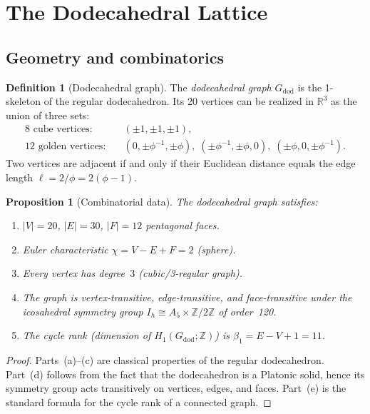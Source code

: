 \documentclass[12pt,a4paper]{article}
\newtheorem{proposition}[theorem]{Proposition}
\theoremstyle{definition}
\newtheorem{definition}[theorem]{Definition}
\theoremstyle{remark}
\newcommand{\R}{\mathbb{R}}
\newcommand{\Z}{\mathbb{Z}}
\newcommand{\ph}{\phi}
\begin{document}
\section{The Dodecahedral Lattice}\label{sec:dodecahedron}

\subsection{Geometry and combinatorics}\label{ssec:geom}

\begin{definition}[Dodecahedral graph]\label{def:dodgraph}
The \emph{dodecahedral graph} $G_{\mathrm{dod}}$ is the 1-skeleton of the
regular dodecahedron.  Its 20 vertices can be realized in $\R^3$ as the
union of three sets:
\begin{align}
  \text{8 cube vertices:}& \quad (\pm 1, \pm 1, \pm 1), \label{eq:cube}\\
  \text{12 golden vertices:}& \quad (0, \pm\ph^{-1}, \pm\ph),\;
    (\pm\ph^{-1}, \pm\ph, 0),\;
    (\pm\ph, 0, \pm\ph^{-1}). \label{eq:golden}
\end{align}
Two vertices are adjacent if and only if their Euclidean distance equals
the edge length $\ell = 2/\ph = 2(\ph - 1)$.
\end{definition}

\begin{proposition}[Combinatorial data]\label{prop:combdata}
The dodecahedral graph satisfies:
\begin{enumerate}[label=\textup{(\alph*)}]
  \item $|V| = 20$, $|E| = 30$, $|F| = 12$ pentagonal faces.
  \item Euler characteristic $\chi = V - E + F = 2$ (sphere).
  \item Every vertex has degree~$3$ (cubic/3-regular graph).
  \item The graph is vertex-transitive, edge-transitive, and face-transitive
        under the icosahedral symmetry group $I_h \cong A_5 \times \Z/2\Z$
        of order~120.
  \item The cycle rank (dimension of $H_1(G_{\mathrm{dod}};\Z)$) is
        $\beta_1 = E - V + 1 = 11$.
\end{enumerate}
\end{proposition}

\begin{proof}
Parts~(a)--(c) are classical properties of the regular dodecahedron.
Part~(d) follows from the fact that the dodecahedron is a Platonic solid,
hence its symmetry group acts transitively on vertices, edges, and faces.
Part~(e) is the standard formula for the cycle rank of a connected graph.
\end{proof}
\end{document}
